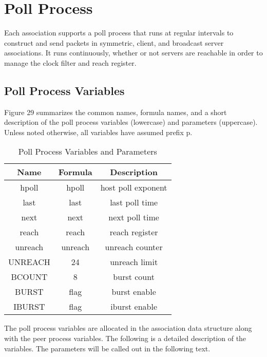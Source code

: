 \chapter{Poll Process}

Each association supports a poll process that runs at regular
intervals to construct and send packets in symmetric, client, and
broadcast server associations.  It runs continuously, whether or not
servers are reachable in order to manage the clock filter and reach
register.

\section{Poll Process Variables}

Figure 29 summarizes the common names, formula names, and a short
description of the poll process variables (lowercase) and parameters
(uppercase).  Unless noted otherwise, all variables have assumed
prefix p.

\begin{table}[htb]
\center
\begin{tabular}{c | c | c}
Name    & Formula & Description        \\
\hline
\hline
hpoll   & hpoll   & host poll exponent \\
last    & last    & last poll time     \\
next    & next    & next poll time     \\
reach   & reach   & reach register     \\
unreach & unreach & unreach counter    \\
UNREACH & 24      & unreach limit      \\
BCOUNT  & 8       & burst count        \\
BURST   & flag    & burst enable       \\
IBURST  & flag    & iburst enable      \\
\hline
\end{tabular}
\label{poll_process_variables_and_parameters}
\caption{Poll Process Variables and Parameters}
\end{table}

The poll process variables are allocated in the association data
structure along with the peer process variables.  The following is a
detailed description of the variables.  The parameters will be called
out in the following text.

